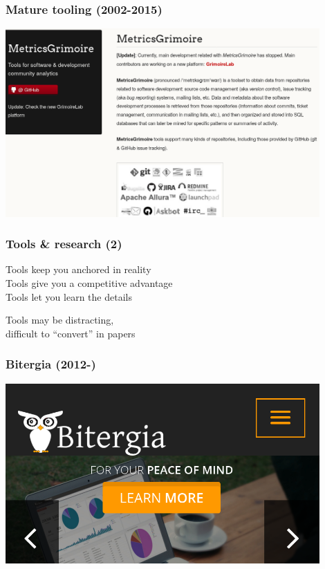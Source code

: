 \documentclass[17pt,aspectratio=169,hyperref=pdfusetitle]{beamer}
\begin{document}
\begin{frame}[fragile]
  \frametitle{Mature tooling (2002-2015)}

  \begin{center}
  \includegraphics[width=12cm]{figs/metricsgrimoire}
  \end{center}  
  
\end{frame}

\begin{frame}[fragile]
  \frametitle{Tools \& research (2)}

  Tools keep you anchored in reality \\
  Tools give you a competitive advantage \\
  Tools let you learn the details \\
  
  \begin{center}
    Tools may be distracting, \\
    difficult to ``convert'' in papers \\
  \end{center}  
  
\end{frame}

\begin{frame}[fragile]
  \frametitle{Bitergia (2012-)}

  \begin{center}
  \includegraphics[width=12cm]{figs/bitergia}
  \end{center}  
  
\end{frame}
\end{document}
